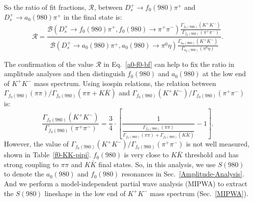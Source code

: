 {    So the ratio of fit fractions, $\mathcal{R}$, between $D_{s}^{+} \rightarrow f_{0}(980)\pi^{+}$ and $D_{s}^{+} \rightarrow a_{0}(980)\pi^{+}$ in the final state is: 
    \begin{equation}
        \mathcal{R}  =\frac{\mathcal{B}(D_{s}^{+} \rightarrow f_{0}(980)\pi^{+}, f_{0}(980) \rightarrow \pi^{+}\pi^{-})  \frac{\Gamma_{f_{0}(980)}(K^{+}K^{-})}{ \Gamma_{f_{0}(980)}(\pi^{+}\pi^{-})}}{\mathcal{B}(D_{s}^{+} \rightarrow a_{0}(980)\pi^{+}, a_{0}(980) \rightarrow \pi^{0}\eta)  \frac{\Gamma_{a_{0}(980)}(K^{+}K^{-})}{ \Gamma_{a_{0}(980)}(\pi^{0}\eta)}}. \label{a0-f0-bf}
    \end{equation}
    
    The confirmation of the value $\mathcal{R}$ in Eq.~\ref{a0-f0-bf} can help to fix the ratio in amplitude analyses and then distinguish $f_{0}(980)$ and $a_{0}(980)$ at the low end of $K^{+}K^{-}$ mass spectrum.
    Using isospin relations,  the relation between $\Gamma_{f_{0}(980)}(\pi\pi) /  \Gamma_{f_{0}(980)}(\pi\pi+K\bar{K})$ and $\Gamma_{f_{0}(980)}(K^{+}K^{-}) / \Gamma_{f_{0}(980)}(\pi^{+}\pi^{-})$ is:
    \begin{equation}
        \frac{\Gamma_{f_{0}(980)}(K^{+}K^{-})}{ \Gamma_{f_{0}(980)}(\pi^{+}\pi^{-})} =  \frac{3}{4} \cdot \left[\frac{1}{\frac{\Gamma_{f_{0}(980)}(\pi\pi)} {\Gamma_{f_{0}(980)}(\pi\pi)+\Gamma_{f_{0}(980)}(K\bar{K})}} -1\right]. \label{f0-KK-pipi-relation}
    \end{equation}
    However, the value of $\Gamma_{f_{0}(980)}(K^{+}K^{-}) / \Gamma_{f_{0}(980)}(\pi^{+}\pi^{-})$ is not well measured, shown in Table~\ref{f0-KK-pipi}. %
    $f_{0}(980)$ is very close to $K\bar{K}$ threshold and has strong coupling to $\pi\pi$ and $K\bar{K}$ final states.
    So, in this analysis, we use $S(980)$ to denote the $a_{0}(980)$ and $f_{0}(980)$ resonances in Sec.~\ref{Amplitude-Analysis}.
    And we perform a model-independent partial wave analysis (MIPWA) to extract the $S(980)$ lineshape in the low end of $K^{+}K^{-}$ mass spectrum (Sec.~\ref{MIPWA}). %
    

}
